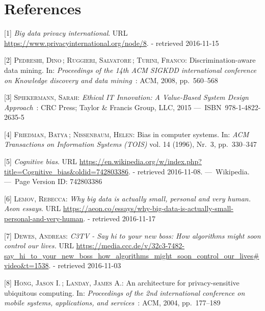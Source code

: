 \documentclass[12pt,english,a4paper,titlepage,cleardoublepage=empty,dottedtoc]{report}
\begin{document}
\chapter*{References}\label{references}

\hypertarget{refs}{}
\hypertarget{ref-web_2016_privacy-international-about-big-data}{}
{[}1{]} \emph{Big data privacy international}. URL
\url{https://www.privacyinternational.org/node/8}. - retrieved
2016-11-15

\hypertarget{ref-paper_2008_discrimination-aware-data-mining}{}
{[}2{]} \textsc{Pedreshi, Dino}\,; \textsc{Ruggieri, Salvatore}\,;
\textsc{Turini, Franco}: Discrimination-aware data mining. In:
\emph{Proceedings of the 14th ACM SIGKDD international conference on
Knowledge discovery and data mining}~: ACM, 2008, pp.~560--568

\hypertarget{ref-book_2015_ethical-it-innovation}{}
{[}3{]} \textsc{Spiekermann, Sarah}: \emph{Ethical IT Innovation: A
Value-Based System Design Approach}~: CRC Press; Taylor \& Francis
Group, LLC, 2015 ---~ISBN~978-1-4822-2635-5

\hypertarget{ref-paper_1996_bias-in-computer-systems}{}
{[}4{]} \textsc{Friedman, Batya}\,; \textsc{Nissenbaum, Helen}: Bias in
computer systems. In: \emph{ACM Transactions on Information Systems
(TOIS)} vol. 14 (1996), Nr.~3, pp.~330--347

\hypertarget{ref-wikipedia_2016_cognitive-bias}{}
{[}5{]} \emph{Cognitive bias}. URL
\url{https://en.wikipedia.org/w/index.php?title=Cognitive_bias\&oldid=742803386}.
- retrieved 2016-11-08. ---~Wikipedia. ---~Page Version ID: 742803386

\hypertarget{ref-web_2016_big-data-is-people}{}
{[}6{]} \textsc{Lemov, Rebecca}: \emph{Why big data is actually small,
personal and very human. Aeon essays}. URL
\url{https://aeon.co/essays/why-big-data-is-actually-small-personal-and-very-human}.
- retrieved 2016-11-17

\hypertarget{ref-video_2015_big-data-and-deep-learning_discrimination}{}
{[}7{]} \textsc{Dewes, Andreas}: \emph{C3TV - Say hi to your new boss:
How algorithms might soon control our lives.} URL
\url{https://media.ccc.de/v/32c3-7482-say_hi_to_your_new_boss_how_algorithms_might_soon_control_our_lives\#video\&t=1538}.
- retrieved 2016-11-03

\hypertarget{ref-study_2004_architecture-for-privacy-sensitive-ubiquitous-computing}{}
{[}8{]} \textsc{Hong, Jason I.}\,; \textsc{Landay, James A.}: An
architecture for privacy-sensitive ubiquitous computing. In:
\emph{Proceedings of the 2nd international conference on mobile systems,
applications, and services}~: ACM, 2004, pp.~177--189
\end{document}

